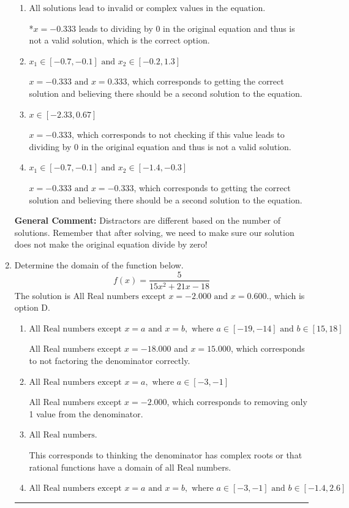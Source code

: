 \documentclass{extbook}[14pt]
\newcommand{\litem}[1]{\item #1

\rule{\textwidth}{0.4pt}}
\begin{document}
\begin{enumerate}
{\begin{enumerate}[label=\Alph*.]
$x = 0.333$, which corresponds to not distributing the factor $-117x -39$ correctly when trying to eliminate the fraction.
\item \( \text{All solutions lead to invalid or complex values in the equation.} \)

*$x = -0.333$ leads to dividing by 0 in the original equation and thus is not a valid solution, which is the correct option.
\item \( x_1 \in [-0.7, -0.1] \text{ and } x_2 \in [-0.2,1.3] \)

$x = -0.333 \text{ and } x = 0.333$, which corresponds to getting the correct solution and believing there should be a second solution to the equation.
\item \( x \in [-2.33,0.67] \)

$x = -0.333$, which corresponds to not checking if this value leads to dividing by 0 in the original equation and thus is not a valid solution.
\item \( x_1 \in [-0.7, -0.1] \text{ and } x_2 \in [-1.4,-0.3] \)

$x = -0.333 \text{ and } x = -0.333$, which corresponds to getting the correct solution and believing there should be a second solution to the equation.
\end{enumerate}

\textbf{General Comment:} Distractors are different based on the number of solutions. Remember that after solving, we need to make sure our solution does not make the original equation divide by zero!
}
\litem{
Determine the domain of the function below.
\[ f(x) = \frac{5}{15x^{2} +21 x -18} \]The solution is \( \text{All Real numbers except } x = -2.000 \text{ and } x = 0.600. \), which is option D.\begin{enumerate}[label=\Alph*.]
\item \( \text{All Real numbers except } x = a \text{ and } x = b, \text{ where } a \in [-19, -14] \text{ and } b \in [15, 18] \)

All Real numbers except $x = -18.000$ and $x = 15.000$, which corresponds to not factoring the denominator correctly.
\item \( \text{All Real numbers except } x = a, \text{ where } a \in [-3, -1] \)

All Real numbers except $x = -2.000$, which corresponds to removing only 1 value from the denominator.
\item \( \text{All Real numbers.} \)

This corresponds to thinking the denominator has complex roots or that rational functions have a domain of all Real numbers.
\item \( \text{All Real numbers except } x = a \text{ and } x = b, \text{ where } a \in [-3, -1] \text{ and } b \in [-1.4, 2.6] \)


\end{enumerate}}
\end{enumerate}
\end{document}
